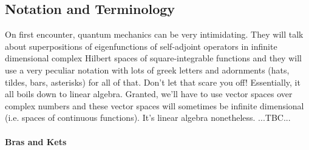 


\subsection{Notation and Terminology}
On first encounter, quantum mechanics can be very intimidating. They will talk about superpositions of eigenfunctions of self-adjoint operators in infinite dimensional complex Hilbert spaces of square-integrable functions and they will use a very peculiar notation with lots of greek letters and adornments (hats, tildes, bars, asterisks) for all of that. Don't let that scare you off! Essentially, it all boils down to linear algebra. Granted, we'll have to use vector spaces over complex numbers and these vector spaces will sometimes be infinite dimensional (i.e. spaces of continuous functions). It's linear algebra nonetheless. ...TBC...





\paragraph{Bras and Kets}

